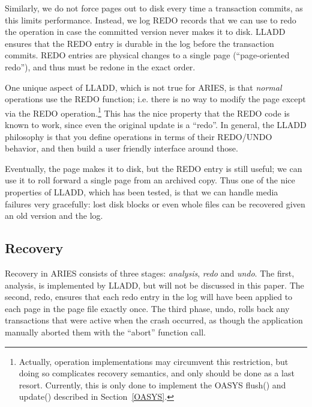 \documentclass[letterpaper,english]{article}
\begin{document}
Similarly, we do not force pages out to disk every time a transaction
commits, as this limits performance.  Instead, we log REDO records
that we can use to redo the operation in case the committed version never
makes it to disk.  LLADD ensures that the REDO entry is durable in the
log before the transaction commits.  REDO entries are physical changes
to a single page (``page-oriented redo''), and thus must be redone in
the exact order.

One unique aspect of LLADD, which
is not true for ARIES, is that {\em normal} operations use the REDO
function; i.e. there is no way to modify the page except via the REDO
operation.\footnote{Actually, operation implementations may circumvent
this restriction, but doing so complicates recovery semantics, and only
should be done as a last resort.  Currently, this is only done to 
implement the OASYS flush() and update() described in Section~\ref{OASYS}.}  
This has the nice property that the REDO code is known to
work, since even the original update is a ``redo''.
In general, the LLADD philosophy is that you
define operations in terms of their REDO/UNDO behavior, and then build
a user friendly interface around those.

Eventually, the page makes it to disk, but the REDO entry is still
useful; we can use it to roll forward a single page from an archived
copy.  Thus one of the nice properties of LLADD, which has been
tested, is that we can handle media failures very gracefully: lost
disk blocks or even whole files can be recovered given an old version
and the log.  

\subsection{Recovery}

%

Recovery in ARIES consists of three stages: {\em analysis}, {\em redo} and {\em undo}. 
The first, analysis, is
implemented by LLADD, but will not be discussed in this
paper. The second, redo, ensures that each redo entry in the log 
will have been applied to each page in the page file exactly once.
The third phase, undo, rolls back any transactions that were active
when the crash occurred, as though the application manually aborted
them with the {}``abort'' function call.
  
\end{document}
